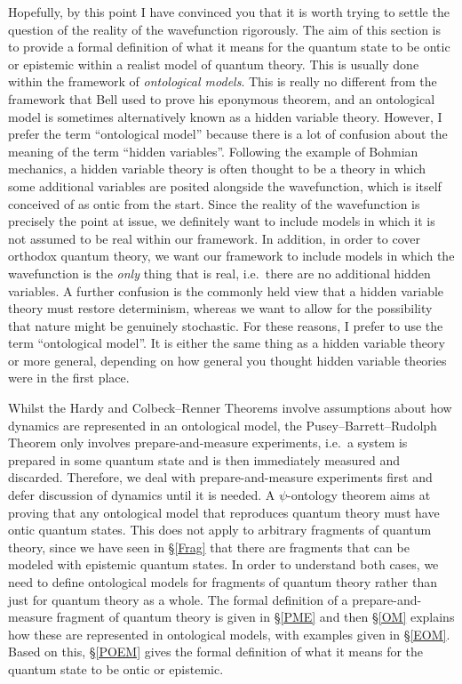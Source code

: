 \documentclass[DIV=calc,fontsize=12pt]{scrartcl} %
\theoremstyle{definition}
\theoremstyle{plain}
\begin{document}
Hopefully, by this point I have convinced you that it is worth trying
to settle the question of the reality of the wavefunction rigorously.
The aim of this section is to provide a formal definition of what it
means for the quantum state to be ontic or epistemic within a realist
model of quantum theory.  This is usually done within the framework of
\emph{ontological models}.  This is really no different from the
framework that Bell used to prove his eponymous theorem, and an
ontological model is sometimes alternatively known as a hidden
variable theory.  However, I prefer the term ``ontological model''
because there is a lot of confusion about the meaning of the term
``hidden variables''.  Following the example of Bohmian mechanics, a
hidden variable theory is often thought to be a theory in which some
additional variables are posited alongside the wavefunction, which is
itself conceived of as ontic from the start.  Since the reality of the
wavefunction is precisely the point at issue, we definitely want to
include models in which it is not assumed to be real within our
framework.  In addition, in order to cover orthodox quantum theory, we
want our framework to include models in which the wavefunction is the
\emph{only} thing that is real, i.e.\ there are no additional hidden
variables.  A further confusion is the commonly held view that a
hidden variable theory must restore determinism, whereas we want to
allow for the possibility that nature might be genuinely stochastic.
For these reasons, I prefer to use the term ``ontological model''.  It
is either the same thing as a hidden variable theory or more general,
depending on how general you thought hidden variable theories were in
the first place.

Whilst the Hardy and Colbeck--Renner Theorems involve assumptions about
how dynamics are represented in an ontological model, the Pusey--Barrett--Rudolph Theorem
only involves prepare-and-measure experiments, i.e.\ a system is
prepared in some quantum state and is then immediately measured and
discarded.  Therefore, we deal with prepare-and-measure experiments
first and defer discussion of dynamics until it is needed.  A
$\psi$-ontology theorem aims at proving that any ontological model
that reproduces quantum theory must have ontic quantum states.  This
does not apply to arbitrary fragments of quantum theory, since we have
seen in \S\ref{Frag} that there are fragments that can be modeled
with epistemic quantum states.  In order to understand both cases, we
need to define ontological models for fragments of quantum theory
rather than just for quantum theory as a whole.  The formal definition
of a prepare-and-measure fragment of quantum theory is given in
\S\ref{PME} and then \S\ref{OM} explains how these are represented in
ontological models, with examples given in \S\ref{EOM}.  Based on
this, \S\ref{POEM} gives the formal definition of what it means for
the quantum state to be ontic or epistemic.
\end{document}
